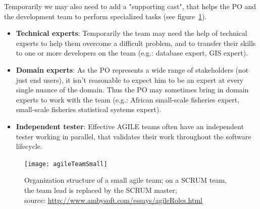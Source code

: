 \documentclass[11pt]{article} %
\begin{document}
Temporarily we may also need to add a "supporting cast", that helps the PO and the development team to perform specialized tasks (see figure~\ref{agile-pic}).
\begin{itemize}
\item \textbf{Technical experts}: Temporarily the team may need the help of technical experts to help them overcome a difficult problem, and to transfer their skills to one or more developers on the team (e.g.: database expert, GIS expert).
\item \textbf{Domain experts}: As the PO represents a wide range of stakeholders (not just end users), it isn't reasonable to expect him to be an expert at every single nuance of the domain. Thus the PO may sometimes bring in domain experts to work with the team (e.g.: African small-scale fisheries expert, small-scale fisheries statistical systems expert). 
\item \textbf{Independent tester}: Effective AGILE teams often have an independent tester working in parallel, that validates their work throughout the software lifecycle. 
\end{itemize}

  \begin{figure}[!ht]%
    \begin{center} 
	\texttt{[image: agileTeamSmall]}
      \caption[Organization structure of a small agile team;]
{Organization structure of a small agile team; on a SCRUM team, the team lead is replaced by the SCRUM master;\\ source: \url{http://www.ambysoft.com/essays/agileRoles.html}}
      \label{agile-pic} %
    \end{center} 
  \end{figure}
\end{document}
